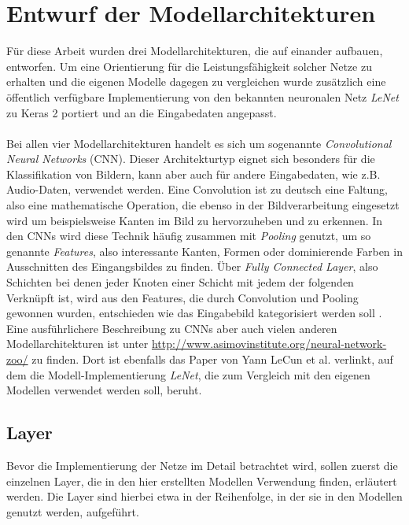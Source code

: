 \section{Entwurf der Modellarchitekturen}
Für diese Arbeit wurden drei Modellarchitekturen, die auf einander aufbauen, entworfen. Um eine Orientierung für die Leistungsfähigkeit solcher Netze zu erhalten und die eigenen Modelle dagegen zu vergleichen wurde zusätzlich eine öffentlich verfügbare Implementierung von den bekannten neuronalen Netz \textit{LeNet} zu Keras 2 portiert und an die Eingabedaten angepasst. \\
\\
Bei allen vier Modellarchitekturen handelt es sich um sogenannte \textit{Convolutional Neural Networks} (CNN). Dieser Architekturtyp eignet sich besonders für die Klassifikation von Bildern, kann aber auch für andere Eingabedaten, wie z.B. Audio-Daten, verwendet werden. Eine Convolution ist zu deutsch eine Faltung, also eine mathematische Operation, die ebenso in der Bildverarbeitung eingesetzt wird um beispielsweise Kanten im Bild zu hervorzuheben und zu erkennen.
In den CNNs wird diese Technik häufig zusammen mit \textit{Pooling} genutzt, um so genannte \textit{Features}, also interessante Kanten, Formen oder dominierende Farben in Ausschnitten des Eingangsbildes zu finden. Über \textit{Fully Connected Layer}, also Schichten bei denen jeder Knoten einer Schicht mit jedem der folgenden Verknüpft ist, wird aus den Features, die durch Convolution und Pooling gewonnen wurden, entschieden wie das Eingabebild kategorisiert werden soll \cite{nn-zoo}.
Eine ausführlichere Beschreibung zu CNNs aber auch vielen anderen Modellarchitekturen ist unter \url{http://www.asimovinstitute.org/neural-network-zoo/} zu finden. Dort ist ebenfalls das Paper \cite{lecun-98} von Yann LeCun et al. verlinkt, auf dem die Modell-Implementierung \textit{LeNet}, die zum Vergleich mit den eigenen Modellen verwendet werden soll, beruht.

\subsection{Layer}
Bevor die Implementierung der Netze im Detail betrachtet wird, sollen zuerst die einzelnen Layer, die in den hier erstellten Modellen Verwendung finden, erläutert werden. Die Layer sind hierbei etwa in der Reihenfolge, in der sie in den Modellen genutzt werden, aufgeführt.


